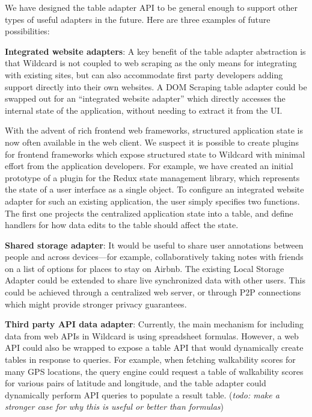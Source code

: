 \documentclass[sigplan,10pt,anonymous,review]{acmart}
\begin{document}
We have designed the table adapter API to be general enough to support
other types of useful adapters in the future. Here are three examples of
future possibilities:

\textbf{Integrated website adapters}: A key benefit of the table adapter
abstraction is that Wildcard is not coupled to web scraping as the only
means for integrating with existing sites, but can also accommodate
first party developers adding support directly into their own websites.
A DOM Scraping table adapter could be swapped out for an ``integrated
website adapter'' which directly accesses the internal state of the
application, without needing to extract it from the UI.

With the advent of rich frontend web frameworks, structured application
state is now often available in the web client. We suspect it is
possible to create plugins for frontend frameworks which expose
structured state to Wildcard with minimal effort from the application
developers. For example, we have created an initial prototype of a
plugin for the Redux state management library, which represents the
state of a user interface as a single object. To configure an integrated
website adapter for such an existing application, the user simply
specifies two functions. The first one projects the centralized
application state into a table, and define handlers for how data edits
to the table should affect the state.

\textbf{Shared storage adapter}: It would be useful to share user
annotations between people and across devices---for example,
collaboratively taking notes with friends on a list of options for
places to stay on Airbnb. The existing Local Storage Adapter could be
extended to share live synchronized data with other users. This could be
achieved through a centralized web server, or through P2P connections
which might provide stronger privacy guarantees.

\textbf{Third party API data adapter}: Currently, the main mechanism for
including data from web APIs in Wildcard is using spreadsheet formulas.
However, a web API could also be wrapped to expose a table API that
would dynamically create tables in response to queries. For example,
when fetching walkability scores for many GPS locations, the query
engine could request a table of walkability scores for various pairs of
latitude and longitude, and the table adapter could dynamically perform
API queries to populate a result table. (\emph{todo: make a stronger
case for why this is useful or better than formulas})
\end{document}
